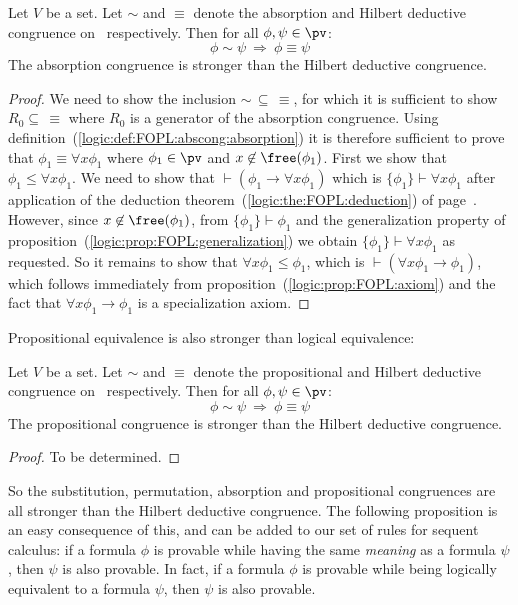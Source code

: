\begin{prop}\label{logic:prop:FOPL:HDC:absorption:v:HDC}
Let $V$ be a set. Let $\sim$ and $\equiv$ denote the absorption and
Hilbert deductive congruence on \pv\ respectively. Then for all
$\phi,\psi\in\pv$:
    \[
    \phi\sim\psi\ \Rightarrow\ \phi\equiv\psi
    \]
The absorption congruence is stronger than the Hilbert deductive
congruence.
\end{prop}
\begin{proof}
We need to show the inclusion $\sim\,\subseteq\,\equiv$, for which
it is sufficient to show $R_{0}\subseteq\,\equiv$ where $R_{0}$ is a
generator of the absorption congruence. Using
definition~(\ref{logic:def:FOPL:abscong:absorption}) it is therefore
sufficient to prove that $\phi_{1}\equiv\forall x\phi_{1}$ where
$\phi_{1}\in\pv$ and $x\not\in\free(\phi_{1})$. First we show that
$\phi_{1}\leq\forall x\phi_{1}$. We need to show that
$\vdash(\phi_{1}\to\forall x\phi_{1})$ which is
$\{\phi_{1}\}\vdash\forall x\phi_{1}$ after application of the
deduction theorem~(\ref{logic:the:FOPL:deduction}) of
page~\pageref{logic:the:FOPL:deduction}. However, since
$x\not\in\free(\phi_{1})$, from $\{\phi_{1}\}\vdash\phi_{1}$ and the
generalization property of
proposition~(\ref{logic:prop:FOPL:generalization}) we obtain
$\{\phi_{1}\}\vdash\forall x\phi_{1}$ as requested. So it remains to
show that $\forall x\phi_{1}\leq\phi_{1}$, which is $\vdash(\forall
x\phi_{1}\to\phi_{1})$, which follows immediately from
proposition~(\ref{logic:prop:FOPL:axiom}) and the fact that $\forall
x\phi_{1}\to\phi_{1}$ is a specialization axiom.
\end{proof}

Propositional equivalence is also stronger than logical equivalence:

\begin{prop}\label{logic:prop:FOPL:HDC:propositional:v:HDC}
Let $V$ be a set. Let $\sim$ and $\equiv$ denote the propositional
and Hilbert deductive congruence on \pv\ respectively. Then for all
$\phi,\psi\in\pv$:
    \[
    \phi\sim\psi\ \Rightarrow\ \phi\equiv\psi
    \]
The propositional congruence is stronger than the Hilbert deductive
congruence.
\end{prop}
\begin{proof}
To be determined.
\end{proof}


So the substitution, permutation, absorption and propositional
congruences are all stronger than the Hilbert deductive congruence.
The following proposition is an easy consequence of this, and can be
added to our set of rules for sequent calculus: if a formula $\phi$
is provable while having the same {\em meaning} as a formula $\psi$,
then $\psi$ is also provable. In fact, if a formula $\phi$ is
provable while being logically equivalent to a formula $\psi$, then
$\psi$ is also provable.


